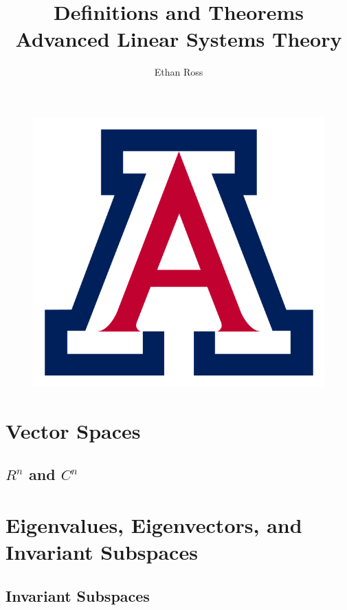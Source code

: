 \documentclass{article}
\title{
\Huge Definitions and Theorems\\
\Large Advanced Linear Systems Theory
}
\author{Ethan Ross}
\date{}
\theoremstyle{definition} %
\theoremstyle{definition}
\begin{document}
\maketitle
\vspace{2cm}

\begin{figure}[h]
	\centering
	\includegraphics[scale = 0.4]{UOA_Logo.png}
\end{figure}

\clearpage
\tableofcontents
\clearpage

\section{Vector Spaces} \label{ch:1}

\subsection{$R^n$ and $C^n$} \label{sec:1A}

\section{Eigenvalues, Eigenvectors, and Invariant Subspaces} \label{ch:5}

\subsection{Invariant Subspaces} \label{sec:5A}
\end{document}
